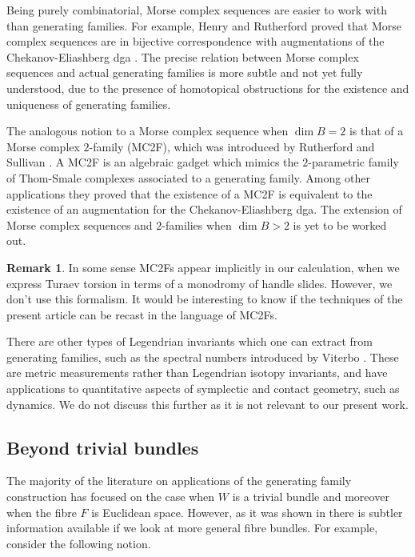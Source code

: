 \documentclass[JEP,XML,SOM,Unicode,NoFloatCountersInSection]{cedram}
\theoremstyle{plain}
\theoremstyle{definition}
\newtheorem{remark}[theorem]{Remark}
\begin{document}
Being purely combinatorial, Morse complex sequences are easier to work with than generating families. For example, Henry and Rutherford proved that Morse complex sequences are in bijective correspondence with augmentations of the Chekanov-Eliashberg dga \cite{HR15}. The precise relation between Morse complex sequences and actual generating families is more subtle and not yet fully understood, due to the presence of homotopical obstructions for the existence and uniqueness of generating families.

The analogous notion to a Morse complex sequence when $\dim B =2$ is that of a Morse complex $2$-family (MC2F), which was introduced by Rutherford and Sullivan \cite{RS18}. A MC2F is an algebraic gadget which mimics the $2$-parametric family of Thom-Smale complexes associated to a generating family. Among other applications they proved that the existence of a MC2F is equivalent to the existence of an augmentation for the Chekanov-Eliashberg dga. The extension of Morse complex sequences and $2$-families when $\dim B >2$ is yet to be worked out.

\begin{remark} In some sense MC2Fs appear implicitly in our calculation, when we express Turaev torsion in terms of a monodromy of handle slides. However, we don't use this formalism. It would be interesting to know if the techniques of the present article can be recast in the language of MC2Fs.
\end{remark}

There are other types of Legendrian invariants which one can extract from generating families, such as the spectral numbers introduced by Viterbo \cite{V92}. These are metric measurements rather than Legendrian isotopy invariants, and have applications to quantitative aspects of symplectic and contact geometry, such as dynamics. We do not discuss this further as it is not relevant to our present work.

\subsection{Beyond trivial bundles}

The majority of the literature on applications of the generating family construction has focused on the case when $W$ is a trivial bundle and moreover when the fibre $F$ is Euclidean space. However, as it was shown in \cite{EG98} there is subtler information available if we look at more general fibre bundles. For example, consider the following notion.
\end{document}
